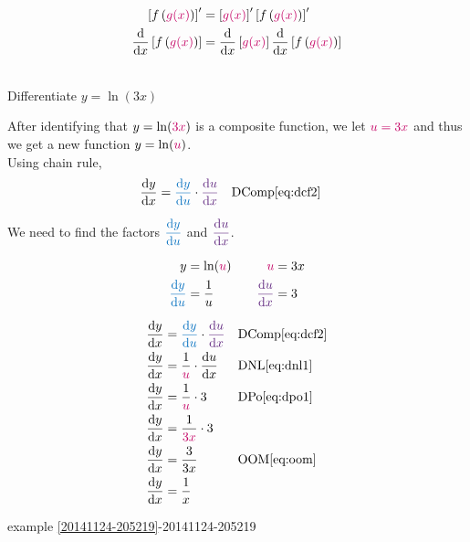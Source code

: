 \documentclass[20150903-160354-rs2.2-MarksMathNotebook.tex]{subfiles}
\begin{document}
\begin{arule}
\begin{align}
	\left[f \left( \cRed{g(x)} \right) \right]' &= \left[\cRed{g(x)} \right]' \left[f\left(\cRed{g(x)}\right)\right]' \label{eq:dcf1} \\
	\dfrac{\dd}{\dx} \left[f \left( \cRed{g(x)} \right) \right] &= \dfrac{\dd}{\dx} \left[\cRed{g(x)} \right] \dfrac{\dd}{\dx} \left[f\left(\cRed{g(x)}\right)\right]  \label{eq:dcf2}
\end{align}
\end{arule}

\begin{example}[id:20141124-203850] \label{20141124-203850} \hfill \\

Differentiate $y=\ln (3x)$

\soln

\solnsteps

After identifying that $y=\ln (\cRed{3x})$ is a composite function, we let $\cRed{u=3x}$ and thus we get a new function $y=\ln (\cRed{u})$.\\

Using chain rule,
\begin{align*}
\dydx &= \cBlue{\dydu} \cdot \cPurple{\dudx} && \text{DComp} \eqref{eq:dcf2}
\end{align*}

We need to find the factors $\cBlue{\dydu}$ and $\cPurple{\dudx}$.

\begin{alignat*}{2}
		y &= \ln (\cRed{u})				&\quad	 		\cRed{u}		&= 3x \\
	\cBlue{\dydu} &= \dfrac{1}{u}		&\quad 	 \cPurple{\dudx}	 &= 3
\end{alignat*}

\begin{align*}
\dydx &= \cBlue{\dydu} \cdot \cPurple{\dudx} && \text{DComp} \eqref{eq:dcf2} \\
\dydx &= \dfrac{1}{\cRed{u}} \cdot \dudx && \text{DNL} \eqref{eq:dnl1} \\
\dydx &= \dfrac{1}{\cRed{u}} \cdot 3 && \text{DPo} \eqref{eq:dpo1} \\
\dydx &= \dfrac{1}{\cRed{3x}} \cdot 3 \\	%
\dydx &= \dfrac{3}{3x} && \text{OOM} \eqref{eq:oom} \\
\dydx &= \dfrac{1}{x} %
\end{align*}

\qdepend

\qdependlist

example \ref{20141124-205219}-20141124-205219

\end{example}
\end{document}
